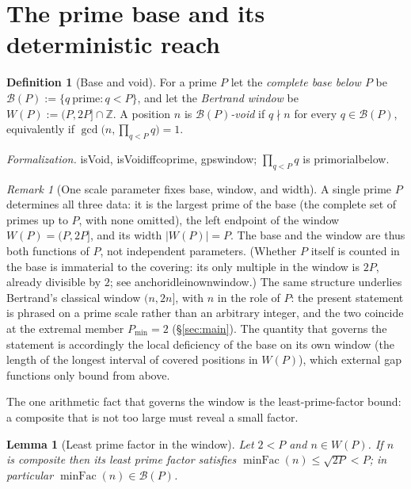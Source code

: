 \documentclass[11pt,a4paper]{amsart}
\theoremstyle{plain}
\newtheorem{lemma}[theorem]{Lemma}
\theoremstyle{definition}
\newtheorem{definition}[theorem]{Definition}
\theoremstyle{plain}
\theoremstyle{remark}
\newtheorem{remark}[theorem]{Remark}
\newcommand{\lean}[1]{\begingroup\upshape\ttfamily\def\_{\textunderscore\allowbreak}#1\endgroup}
\newcommand{\Formal}[1]{\par\smallskip\noindent\begingroup\raggedright\emph{Formalization.} #1\par\endgroup\smallskip}
\begin{document}
\section{The prime base and its deterministic reach}
\label{sec:reach}

\begin{definition}[Base and void]
For a prime $P$ let the \emph{complete base below $P$} be
$\mathcal{B}(P):=\{q\ \text{prime}: q<P\}$, and let the \emph{Bertrand window} be
$W(P):=(P,2P]\cap\mathbb{Z}$. A position $n$ is \emph{$\mathcal{B}(P)$-void} if
$q\nmid n$ for every $q\in\mathcal{B}(P)$, equivalently if
$\gcd\!\big(n,\prod_{q<P}q\big)=1$.
\end{definition}

\Formal{\lean{isVoid}, \lean{isVoid\_iff\_coprime}, \lean{gps\_window};
$\prod_{q<P}q$ is \lean{primorial\_below}.}

\begin{remark}[One scale parameter fixes base, window, and width]\label{rem:triple}
A single prime $P$ determines all three data: it is the largest prime of the base (the complete
set of primes up to $P$, with none omitted), the left endpoint of the window $W(P)=(P,2P]$, and
its width $|W(P)|=P$. The base and the window are thus both functions of $P$, not independent
parameters. (Whether $P$ itself is counted in the base is immaterial to the covering: its only
multiple in the window is $2P$, already divisible by $2$; see
\lean{anchor\_idle\_in\_own\_window}.) The same structure underlies Bertrand's classical window
$(n,2n]$, with $n$ in the role of $P$: the present statement is phrased on a prime scale rather
than an arbitrary integer, and the two coincide at the extremal member $P_{\min}=2$
(\S\ref{sec:main}). The quantity that governs the statement is accordingly the local deficiency
of the base on its own window (the length of the longest interval of covered positions in
$W(P)$), which external gap functions only bound from above.
\end{remark}

The one arithmetic fact that governs the window is the least-prime-factor bound: a
composite that is not too large must reveal a small factor.

\begin{lemma}[Least prime factor in the window]\label{lem:lpf}
Let $2<P$ and $n\in W(P)$. If $n$ is composite then its least prime factor satisfies
$\operatorname{minFac}(n)\le\sqrt{2P}<P$; in particular
$\operatorname{minFac}(n)\in\mathcal{B}(P)$.
\end{lemma}
\end{document}
